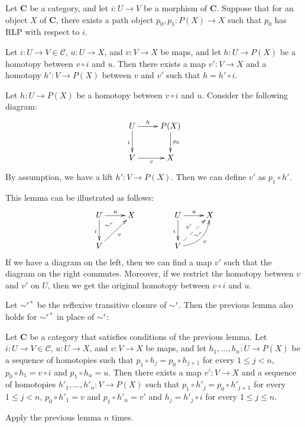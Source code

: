 \documentclass{tac}
\theoremstyle{definition}
\newcommand{\cof}{\mathcal{C}}
\newcommand{\cat}[1]{\mathbf{#1}}
\newcommand{\C}{\cat{C}}
\begin{document}
\begin{lem}
Let $\C$ be a category, and let $i : U \to V$ be a morphism of $\C$.
Suppose that for an object $X$ of $\C$, there exists a path object $p_0,p_1 : P(X) \to X$ such that $p_0$ has RLP with respect to $i$.

Let $i : U \to V \in \cof$, $u : U \to X$, and $v : V \to X$ be maps, and let $h : U \to P(X)$ be a homotopy between $v \circ i$ and $u$.
Then there exists a map $v' : V \to X$ and a homotopy $h' : V \to P(X)$ between $v$ and $v'$ such that $h = h' \circ i$.
\end{lem}
\proof
Let $h : U \to P(X)$ be a homotopy between $v \circ i$ and $u$.
Consider the following diagram:
\[ \xymatrix{ U \ar[r]^-h \ar[d]_i & P(X) \ar[d]^{p_0} \\
              V \ar[r]_v & X
            } \]
By assumption, we have a lift $h' : V \to P(X)$.
Then we can define $v'$ as $p_1 \circ h'$.
\endproof

This lemma can be illustrated as follows:
\[ \xymatrix{ U \ar[r]^u \ar[d]_i \ar@{}[dr]|(.3){\sim^r} & X \\
              V \ar[ur]_v &
            }
\qquad \qquad
   \xymatrix{ U \ar[r]^u \ar[d]_i \ar@{}[dr]|(.62){\sim^r} & X \\
              V \ar@{-->}[ur]^{v'} \ar@/_1pc/[ur]_v &
            } \]
If we have a diagram on the left, then we can find a map $v'$ such that the diagram on the right commutes.
Moreover, if we restrict the homotopy between $v$ and $v'$ on $U$, then we get the original homotopy between $v \circ i$  and $u$.

Let $\sim^{r*}$ be the reflexive transitive closure of $\sim^r$.
Then the previous lemma also holds for $\sim^{r*}$ in place of $\sim^r$:

\begin{lem}
Let $\C$ be a category that satisfies conditions of the previous lemma.
Let $i : U \to V \in \cof$, $u : U \to X$, and $v : V \to X$ be maps, and let $h_1, \ldots, h_n : U \to P(X)$ be a sequence of homotopies
such that $p_1 \circ h_j = p_0 \circ h_{j+1}$ for every $1 \leq j < n$, $p_0 \circ h_1 = v \circ i$ and $p_1 \circ h_n = u$.
Then there exists a map $v' : V \to X$ and a sequence of homotopies $h'_1, \ldots, h'_n : V \to P(X)$
such that $p_1 \circ h'_j = p_0 \circ h'_{j+1}$ for every $1 \leq j < n$, $p_0 \circ h'_1 = v$ and $p_1 \circ h'_n = v'$ and $h_j = h'_j \circ i$ for every $1 \leq j \leq n$.
\end{lem}
\proof
Apply the previous lemma $n$ times.
\endproof
\end{document}
